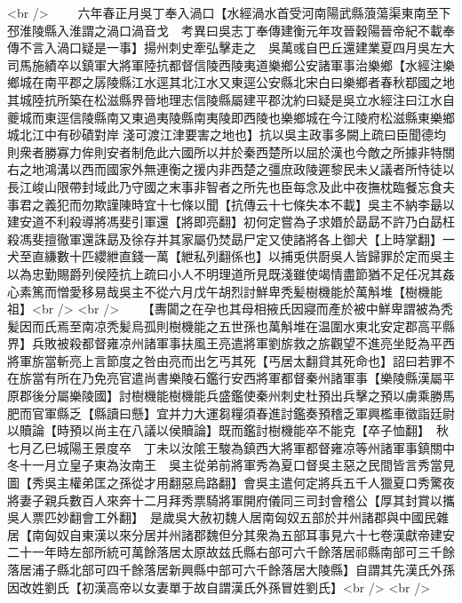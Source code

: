 <br />
　　六年春正月吳丁奉入渦口【水經渦水首受河南陽武縣蒗蕩渠東南至下邳淮陵縣入淮謂之渦口渦音戈　考異曰吳志丁奉傳建衡元年攻晉穀陽晉帝紀不載奉傳不言入渦口疑是一事】揚州刺史牽弘擊走之　吳萬彧自巴丘還建業夏四月吳左大司馬施績卒以鎮軍大將軍陸抗都督信陵西陵夷道樂鄉公安諸軍事治樂鄉【水經注樂鄉城在南平郡之孱陵縣江水逕其北江水又東逕公安縣北宋白曰樂鄉者春秋鄀國之地其城陸抗所築在松滋縣界晉地理志信陵縣屬建平郡沈約曰疑是吳立水經注曰江水自夔城而東逕信陵縣南又東過夷陵縣南夷陵即西陵也樂鄉城在今江陵府松滋縣東樂鄉城北江中有砂磧對岸淺可渡江津要害之地也】抗以吳主政事多闕上疏曰臣聞德均則衆者勝寡力侔則安者制危此六國所以并於秦西楚所以屈於漢也今敵之所據非特關右之地鴻溝以西而國家外無連衡之援内非西楚之彊庶政陵遲黎民未乂議者所恃徒以長江峻山限帶封域此乃守國之末事非智者之所先也臣每念及此中夜撫枕臨餐忘食夫事君之義犯而勿欺謹陳時宜十七條以聞【抗傳云十七條失本不載】吳主不納李朂以建安道不利殺導將馮斐引軍還【將即亮翻】初何定嘗為子求㛰於勗勗不許乃白勗枉殺馮斐擅徹軍還誅勗及徐存并其家屬仍焚勗尸定又使諸將各上御犬【上時掌翻】一犬至直縑數十匹纓紲直錢一萬【紲私列翻係也】以捕兎供㕑吳人皆歸罪於定而吳主以為忠勤賜爵列侯陸抗上疏曰小人不明理道所見既淺雖使竭情盡節猶不足任况其姦心素篤而憎愛移易哉吳主不從六月戊午胡烈討鮮卑秃髪樹機能於萬斛堆【樹機能祖】<br />
<br />
　　【夀闐之在孕也其母相掖氏因寢而產於被中鮮卑謂被為秃髪因而氏焉至南凉秃髪烏孤則樹機能之五世孫也萬斛堆在温圍水東北安定郡高平縣界】兵敗被殺都督雍凉州諸軍事扶風王亮遣將軍劉旂救之旂觀望不進亮坐貶為平西將軍旂當斬亮上言節度之咎由亮而出乞丐其死【丐居太翻貸其死命也】詔曰若罪不在旂當有所在乃免亮官遣尚書樂陵石鑑行安西將軍都督秦州諸軍事【樂陵縣漢屬平原郡後分屬樂陵國】討樹機能樹機能兵盛鑑使秦州刺史杜預出兵擊之預以虜乘勝馬肥而官軍縣乏【縣讀曰懸】宜并力大運芻糧須春進討鑑奏預稽乏軍興檻車徵詣廷尉以贖論【時預以尚主在八議以侯贖論】既而鑑討樹機能卒不能克【卒子恤翻】　秋七月乙巳城陽王景度卒　丁未以汝隂王駿為鎮西大將軍都督雍凉等州諸軍事鎮關中　冬十一月立皇子東為汝南王　吳主從弟前將軍秀為夏口督吳主惡之民間皆言秀當見圖【秀吳主權弟匡之孫從才用翻惡烏路翻】會吳主遣何定將兵五千人獵夏口秀驚夜將妻子親兵數百人來奔十二月拜秀票騎將軍開府儀同三司封會稽公【厚其封賞以攜吳人票匹妙翻會工外翻】　是歲吳大赦初魏人居南匈奴五部於并州諸郡與中國民雜居【南匈奴自東漢以來分居并州諸郡魏但分其衆為五部耳事見六十七卷漢獻帝建安二十一年時左部所統可萬餘落居太原故兹氏縣右部可六千餘落居祁縣南部可三千餘落居浦子縣北部可四千餘落居新興縣中部可六千餘落居大陵縣】自謂其先漢氏外孫因改姓劉氏【初漢高帝以女妻單于故自謂漢氏外孫冒姓劉氏】<br />
<br />
